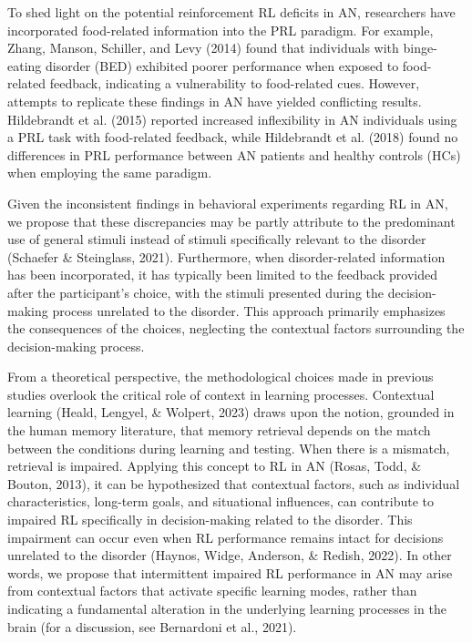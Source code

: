 \documentclass[
  man,floatsintext]{apa6}
\begin{document}
To shed light on the potential reinforcement RL deficits in AN, researchers have incorporated food-related information into the PRL paradigm. For example, Zhang, Manson, Schiller, and Levy (2014) found that individuals with binge-eating disorder (BED) exhibited poorer performance when exposed to food-related feedback, indicating a vulnerability to food-related cues. However, attempts to replicate these findings in AN have yielded conflicting results. Hildebrandt et al. (2015) reported increased inflexibility in AN individuals using a PRL task with food-related feedback, while Hildebrandt et al. (2018) found no differences in PRL performance between AN patients and healthy controls (HCs) when employing the same paradigm.

Given the inconsistent findings in behavioral experiments regarding RL in AN, we propose that these discrepancies may be partly attribute to the predominant use of general stimuli instead of stimuli specifically relevant to the disorder (Schaefer \& Steinglass, 2021). Furthermore, when disorder-related information has been incorporated, it has typically been limited to the feedback provided after the participant's choice, with the stimuli presented during the decision-making process unrelated to the disorder. This approach primarily emphasizes the consequences of the choices, neglecting the contextual factors surrounding the decision-making process.

From a theoretical perspective, the methodological choices made in previous studies overlook the critical role of context in learning processes. Contextual learning (Heald, Lengyel, \& Wolpert, 2023) draws upon the notion, grounded in the human memory literature, that memory retrieval depends on the match between the conditions during learning and testing. When there is a mismatch, retrieval is impaired. Applying this concept to RL in AN (Rosas, Todd, \& Bouton, 2013), it can be hypothesized that contextual factors, such as individual characteristics, long-term goals, and situational influences, can contribute to impaired RL specifically in decision-making related to the disorder. This impairment can occur even when RL performance remains intact for decisions unrelated to the disorder (Haynos, Widge, Anderson, \& Redish, 2022). In other words, we propose that intermittent impaired RL performance in AN may arise from contextual factors that activate specific learning modes, rather than indicating a fundamental alteration in the underlying learning processes in the brain (for a discussion, see Bernardoni et al., 2021).
\end{document}
